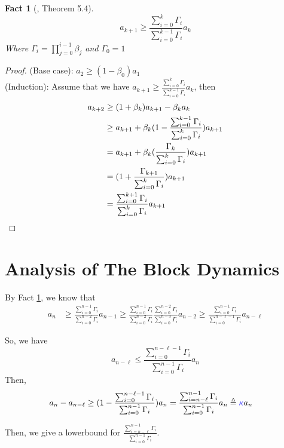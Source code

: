 \documentclass{article}
\newtheorem{fact}{Fact}[section]
\begin{document}
\begin{fact}[\cite{CLV20-1}, Theorem 5.4] \label{fact:decay}
  \[a_{k+1} \geq \frac{\sum_{i=0}^k \Gamma_i}{\sum_{i=0}^{k-1}\Gamma_i} a_k\]
  Where $\Gamma_i = \prod_{j=0}^{i-1} \beta_j$ and $\Gamma_0 = 1$
\end{fact}
\begin{proof}
  (Base case): $a_2 \geq (1 - \beta_0) a_1$ \\
  (Induction): Assume that we have $a_{k+1} \geq \frac{\sum_{i=0}^k \Gamma_i}{\sum_{i=0}^{k-1}\Gamma_i} a_k$, then
  \begin{align*}
    a_{k+2}
    &\geq (1 + \beta_k)a_{k+1} - \beta_ka_k \\
    &\geq a_{k+1} + \beta_k(1 - \frac{\sum_{i=0}^{k-1}\Gamma_i}{\sum_{i=0}^{k}\Gamma_i})a_{k+1} \\
    &= a_{k+1} + \beta_k(\frac{\Gamma_k}{\sum_{i=0}^{k}\Gamma_i})a_{k+1} \\
    &= (1 + \frac{\Gamma_{k+1}}{\sum_{i=0}^k \Gamma_i})a_{k+1} \\
    &= \frac{\sum_{i=0}^{k+1}\Gamma_i}{\sum_{i=0}^k\Gamma_i}a_{k+1} \qedhere
  \end{align*}
\end{proof}

\section{Analysis of The Block Dynamics \cite{CLV20-1}}

By Fact \ref{fact:decay}, we know that
\begin{align*}
  a_n
  &\geq \frac{\sum_{i=0}^{n-1}\Gamma_i}{\sum_{i=0}^{n-2}\Gamma_i} a_{n-1} 
  \geq \frac{\sum_{i=0}^{n-1}\Gamma_i}{\sum_{i=0}^{n-2}\Gamma_i} \frac{\sum_{i=0}^{n-2}\Gamma_i}{\sum_{i=0}^{n-3}\Gamma_i} a_{n-2} 
  \geq \frac{\sum_{i=0}^{n-1}\Gamma_i}{\sum_{i=0}^{n-\ell-1}\Gamma_i} a_{n-\ell}
\end{align*}

So, we have
\[a_{n-\ell} \leq \frac{\sum_{i=0}^{n-\ell-1}\Gamma_i}{\sum_{i=0}^{n-1}\Gamma_i}a_n \]
Then,
\begin{align*}
  a_n - a_{n-\ell} &\geq (1 - \frac{\sum_{i=0}^{n-\ell-1}\Gamma_i}{\sum_{i=0}^{n-1}\Gamma_i})a_n 
  = \frac{\sum_{i=n-\ell}^{n-1}\Gamma_i}{\sum_{i=0}^{n-1}\Gamma_i} a_n\triangleq \textcolor{blue}{\kappa} a_n
\end{align*}

Then, we give a lowerbound for $\frac{\sum_{i=n-\ell}^{n-1}\Gamma_i}{\sum_{i=0}^{n-1}\Gamma_i}$.
\end{document}
